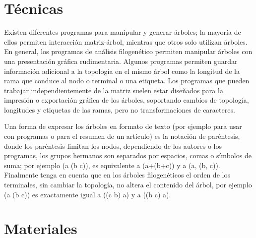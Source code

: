 \section{T\'ecnicas}

\textsf{\large{Existen diferentes programas para manipular y generar 
\'arboles; la mayor\'ia de ellos permiten interacci\'on 
matriz-\'arbol, mientras que otros solo utilizan \'arboles. En general, los 
programas de an\'alisis filogen\'etico permiten manipular \'arboles 
con una presentaci\'on gr\'afica rudimentaria. Algunos programas 
permiten guardar informaci\'on adicional a la topolog\'ia en el 
mismo \'arbol como la longitud de la rama que conduce al nodo o 
terminal o una etiqueta. Los programas que pueden trabajar 
independientemente de la matriz suelen estar dise\~nados para la 
impresi\'on o exportaci\'on gr\'afica de los \'arboles, soportando 
cambios de topolog\'ia, longitudes y etiquetas de las ramas, pero no 
transformaciones de caracteres.}}

\textsf{\large{Una forma de expresar los \'arboles en formato de 
texto (por ejemplo para usar con programas o para el resumen de un 
art\'iculo) es la notaci\'on de par\'entesis, donde los par\'entesis 
limitan los nodos, dependiendo de los autores o los programas, los 
grupos hermanos son separados por espacios, comas o s\'imbolos de 
suma; por ejemplo (a (b c)), es equivalente a (a+(b+c)) y a (a, (b, 
c)). Finalmente tenga en cuenta que en los \'arboles filogen\'eticos 
el orden de los terminales, sin cambiar la topolog\'ia, no altera el 
contenido del \'arbol, por ejemplo (a (b c)) es exactamente igual a 
((c b) a) y a ((b c) a)}}.


\section{Materiales}

